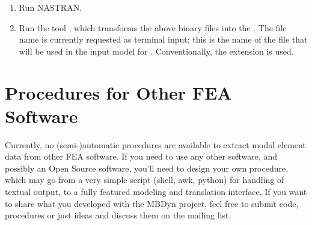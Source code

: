 \begin{enumerate}
\item Run NASTRAN.


\item Run the tool , which transforms the above binary files
into the .
The file name is currently requested as terminal input; this is the name 
of the file that will be used in the input model for .
Conventionally, the  extension is used.

\end{enumerate} %



\section{Procedures for Other FEA Software}
Currently, no (semi-)automatic procedures are available to extract modal
element data from other FEA software.
If you need to use any other software, and possibly an Open Source software,
you'll need to design your own procedure, which may go from a very simple
script (shell, awk, python) for handling of textual output, to a fully
featured modeling and translation interface.
If you want to share what you developed with the MBDyn project, feel free
to submit code, procedures or just ideas and discuss them on the
mailing list.

